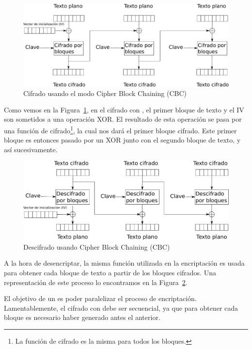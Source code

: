 \begin{figure}[ht]
  \centering
  \includegraphics[scale=0.5]{Figures/CBC_enc}
  \decoRule
  \caption[Cipher Block Chaining (CBC) - Cifrado]{Cifrado usando el modo Cipher Block Chaining (CBC)}
  \label{fig:CBC_enc}
\end{figure}

Como vemos en la Figura~\ref{fig:CBC_enc}, en el cifrado con , el primer bloque de texto y el IV son sometidos a una operación XOR.
El resultado de esta operación se pasa por una función de cifrado\footnote{La función de cifrado es la misma para todos los bloques.}, la cual nos dará el primer bloque cifrado.
Este primer bloque es entonces pasado por un XOR junto con el segundo bloque de texto, y así sucesivamente.

\begin{figure}[ht]
  \centering
  \includegraphics[scale=0.5]{Figures/CBC_dec}
  \decoRule
  \caption[Cipher Block Chaining (CBC) - Descifrado]{Descifrado usando Cipher Block Chaining (CBC)}
  \label{fig:CBC_dec}
\end{figure}

A la hora de desencriptar, la misma función utilizada en la encriptación
es usada para obtener cada bloque de texto a partir de los bloques cifrados.
Una representación de este proceso lo encontramos en la Figura~\ref{fig:CBC_dec}.

El objetivo de un  es poder paralelizar el proceso de encriptación.
Lamentablemente, el cifrado con  debe ser secuencial,
ya que para obtener cada bloque es necesario haber generado antes el anterior.

